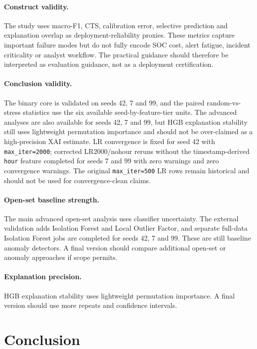 \documentclass[11pt,a4paper]{article}
\begin{document}
\paragraph{Construct validity.}
The study uses macro-F1, CTS, calibration error, selective prediction and explanation overlap as deployment-reliability proxies. These metrics capture important failure modes but do not fully encode SOC cost, alert fatigue, incident criticality or analyst workflow. The practical guidance should therefore be interpreted as evaluation guidance, not as a deployment certification.

\paragraph{Conclusion validity.}
The binary core is validated on seeds 42, 7 and 99, and the paired random-vs-stress statistics use the six available seed-by-feature-tier units. The advanced analyses are also available for seeds 42, 7 and 99, but HGB explanation stability still uses lightweight permutation importance and should not be over-claimed as a high-precision XAI estimate. LR convergence is fixed for seed 42 with \texttt{max\_iter=2000}; corrected LR2000/nohour reruns without the timestamp-derived \texttt{hour} feature completed for seeds 7 and 99 with zero warnings and zero convergence warnings. The original \texttt{max\_iter=500} LR rows remain historical and should not be used for convergence-clean claims.

\paragraph{Open-set baseline strength.}
The main advanced open-set analysis uses classifier uncertainty. The external validation adds Isolation Forest and Local Outlier Factor, and separate full-data Isolation Forest jobs are completed for seeds 42, 7 and 99. These are still baseline anomaly detectors. A final version should compare additional open-set or anomaly approaches if scope permits.

\paragraph{Explanation precision.}
HGB explanation stability uses lightweight permutation importance. A final version should use more repeats and confidence intervals.

\section{Conclusion}
\end{document}
